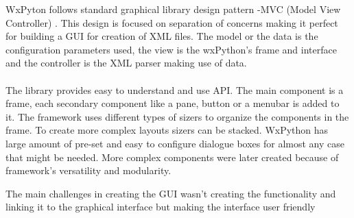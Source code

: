 WxPyton follows standard graphical library design pattern -MVC (Model View Controller) .
 This design is focused on separation of concerns making it perfect for building a GUI for creation of XML files. The model or the 
data is the configuration parameters used, the view is the wxPython's frame and interface and the controller is the XML parser making use of data.
\paragraph{}
The library provides easy to understand and use API. The main component is a frame, each secondary component like a pane, button or a menubar
is added to it. The framework uses different types of sizers to organize the components in the frame. To create more complex layouts
sizers can be stacked. WxPython has large amount of pre-set and easy to configure dialogue boxes for almost any case that might be needed.
More complex components were later created because of framework's versatility and modularity.





The main challenges in creating the GUI wasn't creating the functionality and linking it to the graphical interface but making
the interface user friendly